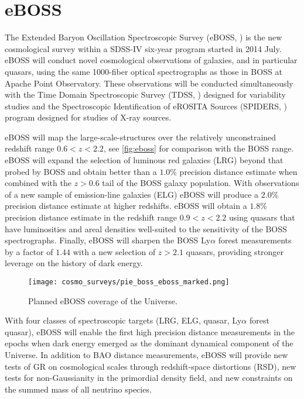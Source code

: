 \section{eBOSS}
The Extended Baryon Oscillation Spectroscopic Survey (eBOSS, \cite{2016AJ....151...44D}) is the new cosmological survey within a SDSS-IV six-year program started in 2014 July. eBOSS will conduct novel cosmological observations of galaxies, and in particular quasars, using the same 1000-fiber optical spectrographs as those in BOSS at Apache Point Observatory. These observations will be conducted simultaneously with the Time Domain Spectroscopic Survey (TDSS, \cite{2015ApJ...806..244M}) designed for variability studies and the Spectroscopic Identification of eROSITA Sources (SPIDERS, \cite{2010SPIE.7741E..1NF}) program designed for studies of X-ray sources.

eBOSS will map the large-scale-structures over the relatively unconstrained redshift range $0.6<z< 2.2$, see \autoref{fig:eboss} for comparison with the BOSS range. eBOSS will expand the selection of luminous red galaxies (LRG) beyond that probed by BOSS and obtain better than a $1.0\%$ precision distance estimate when combined with the $z > 0.6$ tail of the BOSS galaxy population. With observations of a new sample of emission-line galaxies (ELG) eBOSS will produce a $2.0\%$ precision distance estimate at higher redshifts. eBOSS will obtain a $1.8\%$ precision distance estimate in the redshift range $0.9 < z < 2.2$ using quasars that have luminosities and areal densities well-suited to the sensitivity of the BOSS spectrographs. Finally, eBOSS will sharpen the BOSS Ly$\alpha$ forest measurements by a factor of $1.44$ with a new selection of $z > 2.1$ quasars, providing stronger leverage on the history of dark energy.
\begin{figure}[htb]
    \centering
    \texttt{[image: cosmo\_surveys/pie\_boss\_eboss\_marked.png]}
    \caption{Planned eBOSS coverage of the Universe.}
    \label{fig:eboss}
\end{figure}

With four classes of spectroscopic targets (LRG, ELG, quasar, Ly$\alpha$ forest quasar), eBOSS will enable the first high precision distance measurements in the epochs when dark energy emerged as the dominant dynamical component of the Universe. In addition to BAO distance measurements, eBOSS will provide new tests of GR on cosmological scales through redshift-space distortions (RSD), new tests for non-Gaussianity in the primordial density field, and new constraints on the summed mass of all neutrino species.
